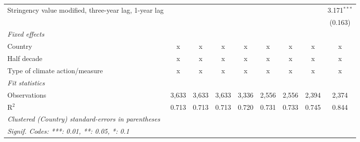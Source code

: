 \begin{table}[htbp]
\begin{tabular}{lcccccccc}
      Stringency value modified, three-year lag, 1-year lag                                              &         &             &         &              &              &               &               & 3.171$^{***}$\\   
                                                                                                         &         &             &         &              &              &               &               & (0.163)\\   
      \emph{Fixed effects}\\
      Country                                                                                            & x       & x           & x       & x            & x            & x             & x             & x\\  
      Half decade                                                                                        & x       & x           & x       & x            & x            & x             & x             & x\\  
      Type of climate action/measure                                                                     & x       & x           & x       & x            & x            & x             & x             & x\\  
      \midrule \emph{Fit statistics}\\
      Observations                                                                                       & 3,633   & 3,633       & 3,633   & 3,336        & 2,556        & 2,556         & 2,394         & 2,374\\  
      R$^2$                                                                                              & 0.713   & 0.713       & 0.713   & 0.720        & 0.731        & 0.733         & 0.745         & 0.844\\  
      \midrule
      \multicolumn{9}{l}{\emph{Clustered (Country) standard-errors in parentheses}}\\
      \multicolumn{9}{l}{\emph{Signif. Codes: ***: 0.01, **: 0.05, *: 0.1}}\\
   \end{tabular}
\end{table}


